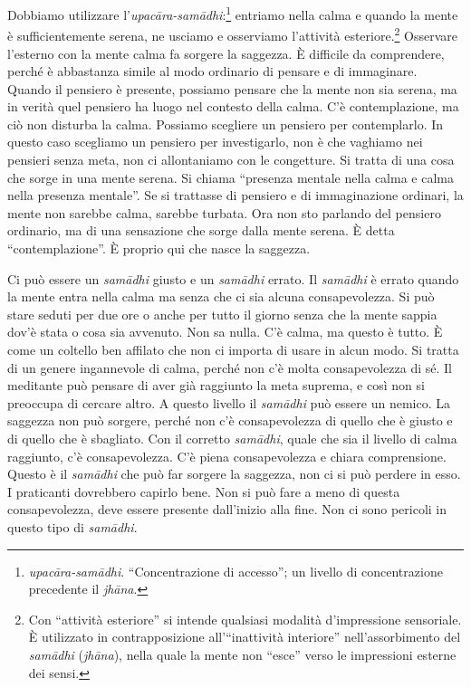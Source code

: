 Dobbiamo utilizzare l'\emph{upacāra-samādhi}:\footnote{\emph{upacāra-samādhi}.
  ``Concentrazione di accesso''; un livello di concentrazione precedente
  il \emph{jhāna}.} entriamo nella calma e quando la mente è
sufficientemente serena, ne usciamo e osserviamo l'attività
esteriore.\footnote{Con ``attività esteriore'' si intende qualsiasi
  modalità d'impressione sensoriale. È utilizzato in contrapposizione
  all'``inattività interiore'' nell'assorbimento del \emph{samādhi}
  (\emph{jhāna}), nella quale la mente non ``esce'' verso le impressioni
  esterne dei sensi.} Osservare l'esterno con la mente calma fa sorgere
la saggezza. È difficile da comprendere, perché è abbastanza simile al
modo ordinario di pensare e di immaginare. Quando il pensiero è
presente, possiamo pensare che la mente non sia serena, ma in verità
quel pensiero ha luogo nel contesto della calma. C'è contemplazione, ma
ciò non disturba la calma. Possiamo scegliere un pensiero per
contemplarlo. In questo caso scegliamo un pensiero per investigarlo, non
è che vaghiamo nei pensieri senza meta, non ci allontaniamo con le
congetture. Si tratta di una cosa che sorge in una mente serena. Si
chiama ``presenza mentale nella calma e calma nella presenza mentale''.
Se si trattasse di pensiero e di immaginazione ordinari, la mente non
sarebbe calma, sarebbe turbata. Ora non sto parlando del pensiero
ordinario, ma di una sensazione che sorge dalla mente serena. È detta
``contemplazione''. È proprio qui che nasce la saggezza.

Ci può essere un \emph{samādhi} giusto e un \emph{samādhi} errato. Il
\emph{samādhi} è errato quando la mente entra nella calma ma senza che
ci sia alcuna consapevolezza. Si può stare seduti per due ore o anche
per tutto il giorno senza che la mente sappia dov'è stata o cosa sia
avvenuto. Non sa nulla. C'è calma, ma questo è tutto. È come un coltello
ben affilato che non ci importa di usare in alcun modo. Si tratta di un
genere ingannevole di calma, perché non c'è molta consapevolezza di sé.
Il meditante può pensare di aver già raggiunto la meta suprema, e così
non si preoccupa di cercare altro. A questo livello il \emph{samādhi}
può essere un nemico. La saggezza non può sorgere, perché non c'è
consapevolezza di quello che è giusto e di quello che è sbagliato. Con
il corretto \emph{samādhi}, quale che sia il livello di calma raggiunto,
c'è consapevolezza. C'è piena consapevolezza e chiara comprensione.
Questo è il \emph{samādhi} che può far sorgere la saggezza, non ci si
può perdere in esso. I praticanti dovrebbero capirlo bene. Non si può
fare a meno di questa consapevolezza, deve essere presente dall'inizio
alla fine. Non ci sono pericoli in questo tipo di \emph{samādhi}.

